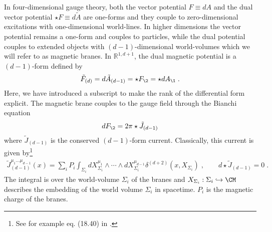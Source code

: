 \documentclass[11pt]{article}
\def\S{{\Sigma}}
\def\w{{\wedge}}
\begin{document}
In four-dimensional gauge theory, both the vector potential $F\equiv dA$ and the dual vector potential $\star F \equiv d\tilde{A}$ are one-forms and they couple to zero-dimensional excitations with one-dimensional world-lines. In higher dimensions the vector potential remains a one-form and couples to particles, while the dual potential couples to extended objects with $(d-1)$-dimensional world-volumes which we will refer to as magnetic branes. In $\mathbb{R}^{1,d+1}$, the dual magnetic potential is a $(d-1)$-form defined by
\begin{equation}
\begin{split}
{\tilde F}_{(d)} = d {\tilde A}_{(d-1)} =  \star F_\2 = \star d A_\1 \; . 
\end{split}
\end{equation}
Here, we have introduced a subscript to make the rank of the differential form explicit. The magnetic brane couples to the gauge field through the Bianchi equation
\begin{equation}
\begin{split}\label{magBianchihigherd}
d F_\2 = 2\pi \star {\tilde J}_{(d-1)} 
\end{split}
\end{equation}
where ${\tilde J}_{(d-1)}$ is the conserved $(d-1)$-form current. Classically, this current is given by\footnote{See for example eq. (18.40) in \cite{Ortin:2015hya}.}
\begin{equation}
\begin{split}
\label{eq:ExtendedCurrent}
{\tilde J}_{(d-1)}^{\mu_1\dots \mu_{d-1}}(x) = \sum_i P_i \int_{\Sigma_i} dX_{\S_i}^{\mu_1} \w \cdots \w dX_{\S_i}^{\mu_{d-1}}\delta^{(d+2)}( x , X_{\S_i}) \;  , \qquad d \star {\tilde J}_{(d-1)} = 0 \; . 
\end{split}
\end{equation}
The integral is over the world-volume $\S_i$ of the branes and $X_{\S_i} : \S_i \hookrightarrow \CM$ describes the embedding of the world volume $\S_i$ in spacetime. $P_i$ is the magnetic charge of the branes.
\end{document}
